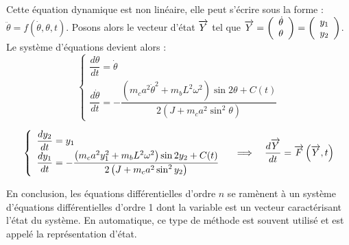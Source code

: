 \documentclass[10pt]{article}
\begin{document}
Cette équation dynamique est non linéaire, elle peut s’écrire sous la forme : $\ddot{\theta}=f(\dot{\theta},\theta,t)$. Posons alors le vecteur d’état $\overrightarrow{Y}$ tel que $\overrightarrow{Y}=\left(\begin{array}{c} \dot{\theta}\\ \theta \end{array}\right) =\left(\begin{array}{c} y_1 \\ y_2 \end{array}\right)$. 
Le système d’équations devient alors :
$$
\left\{\begin{array}{l}
\dfrac{d\theta}{dt} = \dot{\theta} \\
\dfrac{d\dot{\theta}}{dt} = - \dfrac{\left(m_c a^2 \dot{\theta}^2+m_b L^2 \omega^2 \right) \sin 2\theta +C(t)}{2\left(J+m_c a^2  \sin^2\theta\right)}
\end{array}\right.
$$

$$
\left\{\begin{array}{l}
\dfrac{dy_2}{dt} = y_1 \\
\dfrac{dy_1}{dt} = - \dfrac{\left(m_c a^2 y_1^2+m_b L^2 \omega^2 \right) \sin 2 y_2 +C(t)}{2\left(J+m_c a^2  \sin^2y_2\right)}
\end{array}\right.
\quad
\Longrightarrow
\quad
\dfrac{d\overrightarrow{Y}}{dt} = \overrightarrow{F}\left(\overrightarrow{Y},t\right)
$$


En conclusion, les équations différentielles d’ordre $n$ se ramènent à un système d’équations différentielles d’ordre 1 dont la variable est un vecteur caractérisant l’état du système. En automatique, ce type de méthode est souvent utilisé et est appelé la représentation d’état.


\begin{thebibliography}{2}
\end{thebibliography}
\end{document}
